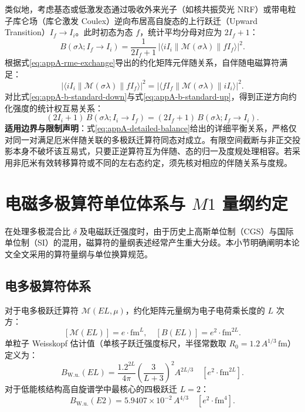 类似地，考虑基态或低激发态通过吸收外来光子（如核共振荧光 NRF）或带电粒子库仑场（库仑激发 Coulex）逆向布居高自旋态的上行跃迁（Upward Transition）$I_f \to I_i$。此时初态为态 $f$，统计平均分母对应为 $2I_f + 1$：
\begin{equation}\label{eq:appA-b-standard-up}
B(\sigma\lambda; I_f \to I_i) = \frac{1}{2I_f + 1} \, |\langle i I_i \| \mathcal{M}(\sigma\lambda) \| f I_f \rangle|^2 .
\end{equation}
根据式\eqref{eq:appA-rme-exchange}导出的约化矩阵元伴随关系，自伴随电磁算符满足：
\begin{equation}\label{eq:appA-adjoint-rme-sq}
|\langle i I_i \| \mathcal{M}(\sigma\lambda) \| f I_f \rangle|^2 = |\langle f I_f \| \mathcal{M}(\sigma\lambda) \| i I_i \rangle|^2 .
\end{equation}
对比式\eqref{eq:appA-b-standard-down}与式\eqref{eq:appA-b-standard-up}，得到正逆方向约化强度的统计权互易关系：
\begin{equation}\label{eq:appA-detailed-balance}
(2I_i + 1) \, B(\sigma\lambda; I_i \to I_f) = (2I_f + 1) \, B(\sigma\lambda; I_f \to I_i) .
\end{equation}
\textbf{适用边界与限制声明}：式\eqref{eq:appA-detailed-balance}给出的详细平衡关系，严格仅对同一对满足厄米伴随关联的多极跃迁算符同态对成立。有限空间截断与非正交投影本身不破坏该互易式，只要正逆算符互为伴随、态的归一及度规处理相容。若采用非厄米有效转移算符或不同的左右态约定，须先核对相应的伴随关系与度规。

\section{电磁多极算符单位体系与 $M1$ 量纲约定}\label{sec:appA-6}

在处理多极混合比 $\delta$ 及电磁跃迁强度时，由于历史上高斯单位制（CGS）与国际单位制（SI）的混用，磁算符的量纲表述经常产生重大分歧。本小节明确阐明本论文全文采用的算符量纲与单位换算规范。

\subsection{电多极算符体系}
对于电多极跃迁算符 $\mathcal{M}(EL, \mu)$，约化矩阵元量纲为电子电荷乘长度的 $L$ 次方：
\begin{equation}\label{eq:appA-el-units}
[\mathcal{M}(EL)] = e \cdot \mathrm{fm}^L , \quad [B(EL)] = e^2 \cdot \mathrm{fm}^{2L} .
\end{equation}
单粒子 Weisskopf 估计值（单核子跃迁强度标尺，半径常数取 $R_0 = 1.2\,A^{1/3}\,\mathrm{fm}$）定义为：
\begin{equation}\label{eq:appA-weisskopf-el}
B_{\mathrm{W.u.}}(EL) = \frac{1.2^{2L}}{4\pi} \left( \frac{3}{L+3} \right)^2 A^{2L/3} \quad [e^2 \cdot \mathrm{fm}^{2L}] .
\end{equation}
对于低能核结构高自旋谱学中最核心的四极跃迁 $L=2$：
\begin{equation}\label{eq:appA-be2-wu}
B_{\mathrm{W.u.}}(E2) = 5.9407 \times 10^{-2} \, A^{4/3} \quad [e^2 \cdot \mathrm{fm}^4] .
\end{equation}

